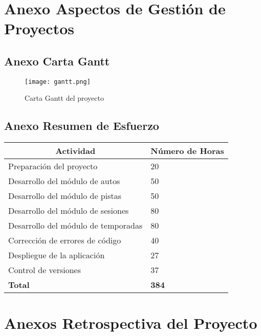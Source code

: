 \section{Anexo Aspectos de Gestión de Proyectos}

\subsection{Anexo Carta Gantt}
\begin{figure}[H]
  \begin{center}
    \texttt{[image: gantt.png]}
  \end{center}
  \caption[Carta Gantt del proyecto]{Carta Gantt del proyecto}
  \label{fig:gantt}
\end{figure}

\subsection{Anexo Resumen de Esfuerzo}
\begin{center}
  \begin{tabular}{ | p{10cm} | p{5cm} |}
    \hline
    \multicolumn{1}{|c|}{\textbf{Actividad}} & \multicolumn{1}{|c|}{\textbf{Número de Horas}} \\
    \hline
    
    {Preparación del proyecto} & {20} \\ \hline
    {Desarrollo del módulo de autos} & {50} \\ \hline
    {Desarrollo del módulo de pistas} & {50} \\ \hline
    {Desarrollo del módulo de sesiones} & {80} \\ \hline
    {Desarrollo del módulo de temporadas} & {80} \\ \hline
    {Corrección de errores de código} & {40} \\ \hline
    {Despliegue de la aplicación} & {27} \\ \hline
    {Control de versiones} & {37} \\ \hline
    
    {\textbf{Total}} & {\textbf{384}} \\

    \hline
  \end{tabular}
  
    \label{table:effort}
\end{center}

\newpage

\section{Anexos Retrospectiva del Proyecto}

